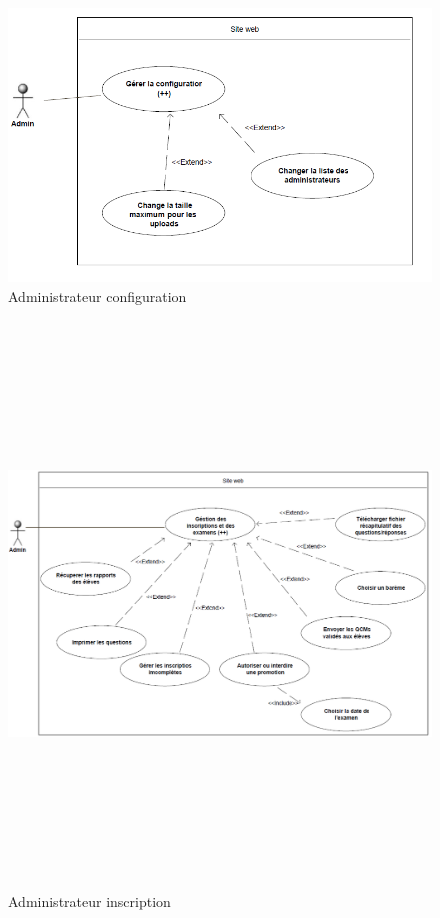    \begin{figure}[h]
        \begin{center}
            \includegraphics[scale=0.85]{images/uml/adminConfiguration.png} 
        \end{center}

        \caption{Administrateur configuration}
        \label{Administrateur configuration}
    \end{figure}

    \begin{figure}[h]
        \begin{center}
            \includegraphics[width=18cm,height=15cm, angle=90]{images/uml/adminInscriptionsExamens.png} 
        \end{center}

        \caption{Administrateur inscription}
        \label{Administrateur inscription}
    \end{figure}

